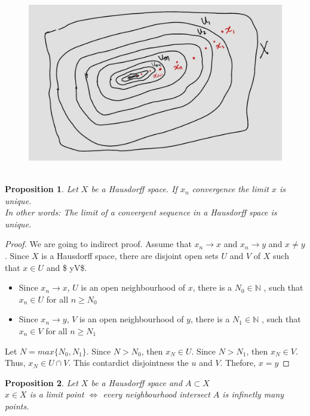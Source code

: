 \documentclass[
]{book}
\providecommand{\tightlist}{%
  \setlength{\itemsep}{0pt}\setlength{\parskip}{0pt}}
\newtheorem{proposition}{Proposition}[chapter]
\theoremstyle{definition}
\theoremstyle{definition}
\theoremstyle{definition}
\theoremstyle{definition}
\theoremstyle{remark}
\begin{document}
\begin{figure}
\centering
\includegraphics{figures/figure 18.jpg}
\caption{\label{fig:fig18}\(~\)}
\end{figure}

\begin{proposition}
\protect\hypertarget{prp:unnamed-chunk-84}{}\label{prp:unnamed-chunk-84}Let \(X\) be a Hausdorff space. If \(x_n\) convergence the limit \(x\) is unique.\\
In other words: The limit of a convergent sequence in a Hausdorff space is unique.
\end{proposition}

\begin{proof}
We are going to indirect proof. Assume that \(x_n \to x\) and \(x_n \to y\) and \(x\neq y\). Since \(X\) is a Hausdorff space, there are disjoint open sets \(U\) and \(V\) of \(X\) such that \(x\in U\) and \$ y\in V\$.

\begin{itemize}
\tightlist
\item
  Since \(x_n \to x\), \(U\) is an open neighbourhood of \(x\), there is a \(N_0\in \mathbb{N}\) , such that \(x_n \in U\) for all \(n\geq N_0\)
\item
  Since \(x_n \to y\), \(V\) is an open neighbourhood of \(y\), there is a \(N_1\in \mathbb{N}\) , such that \(x_n \in V\) for all \(n\geq N_1\)
\end{itemize}

Let \(N=max\{N_0,N_1\}\).
Since \(N>N_0\), then \(x_N\in U\).
Since \(N>N_1\), then \(x_N\in V\).
Thus, \(x_N\in U \cap V\). This contardict disjointness the \(u\) and \(V\). Thefore, \(x=y\)
\end{proof}

\begin{proposition}
\protect\hypertarget{prp:unnamed-chunk-86}{}\label{prp:unnamed-chunk-86}Let \(X\) be a Hausdorff space and \(A\subset X\)\\
\(x\in X\) is a limit point \(\iff\) every neighbourhood intersect \(A\) is infinetly many points.
\end{proposition}
\end{document}
